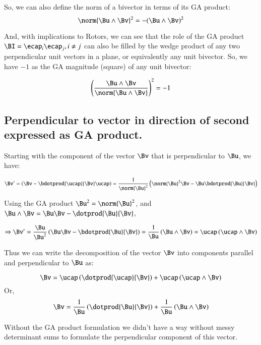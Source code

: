 So, we can also define the norm of a bivector in terms of its GA product:
\[
\norm{\Bu \wedge \Bv}^2 = -(\Bu \wedge \Bv)^2
\]

And, with implications to Rotors, we can see that the role of the GA product $\BI = \ecap_i \ecap_j, i \neq j$ can also be filled by the wedge product of any two perpendicular unit vectors in a plane, or equivalently any unit bivector.  So, we have $-1$ as the GA magnitude (square) of any unit bivector:

\[
\left(\frac{\Bu \wedge \Bv}
{
\norm{\Bu \wedge \Bv}
}\right)^2 = -1
\]

\subsection{Perpendicular to vector in direction of second expressed as GA product.}

Starting with the component of the vector $\Bv$ that is perpendicular to $\Bu$, we have:

\[
\Bv' = \left(\Bv - \bdotprod{\ucap}{\Bv} \ucap \right)
= {\frac{1}{\norm{\Bu}^2}}\left(\norm{\Bu}^2 \Bv - \Bu \bdotprod{\Bu}{\Bv}  \right)
\]

Using the GA product $\Bu^2 = \norm{\Bu}^2$, and $\Bu \wedge \Bv = \Bu \Bv - \dotprod{\Bu}{\Bv}$,

\[
\Rightarrow
\Bv' = \frac{\Bu}{\Bu^2} \left(\Bu \Bv - \bdotprod{\Bu}{\Bv} \right)
=
\frac{1}{\Bu} \left(\Bu \wedge \Bv \right)
=
\ucap \left(\ucap \wedge \Bv \right) 
\]

Thus we can write the decomposition of the vector $\Bv$ into components parallel and perpendicular to $\Bu$ as:

\[
\Bv = \ucap \left(\dotprod{\ucap}{\Bv}\right) + \ucap \left(\ucap \wedge \Bv \right)
\]
Or,
\[
\Bv = \frac{1}{\Bu} \left(\dotprod{\Bu}{\Bv}\right) + \frac{1}{\Bu} \left(\Bu \wedge \Bv \right)
\]

Without the GA product formulation we didn't have a way without messy determinant sums to formulate the perpendicular component of this vector.
